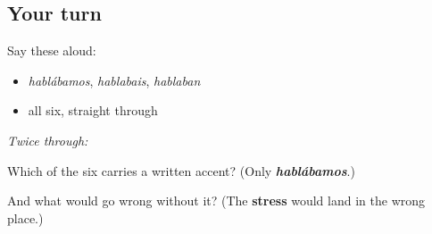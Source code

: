\subsection*{Your turn}
Say these aloud:

\begin{itemize}
\raggedright
  \item \emph{hablábamos}, \emph{hablabais}, \emph{hablaban}
  \item all six, straight through
\end{itemize}

\emph{Twice through:}

\begin{tcolorbox}[breakable,colback=teal!4,colframe=teal!35!black,title={Before you move on}]
Which of the six carries a written accent? (Only \emph{\textbf{hablábamos}}.)

And what would go wrong without it? (The \textbf{stress} would land in the wrong place.)
\end{tcolorbox}
